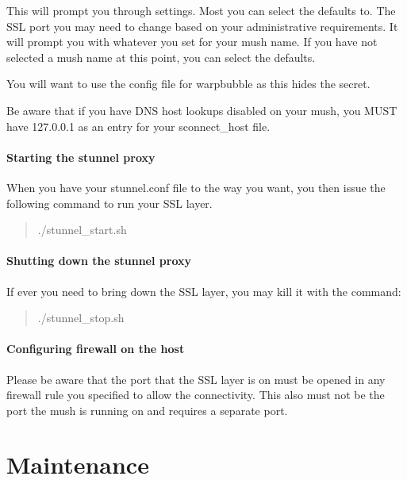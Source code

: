 \documentclass[letterpaper,10pt,english]{sphinxmanual}
\begin{document}
\sphinxAtStartPar
This will prompt you through settings.  Most you can select the defaults to.
The SSL port you may need to change based on your administrative requirements.
It will prompt you with whatever you set for your mush name.  If you have not
selected a mush name at this point, you can select the defaults.

\sphinxAtStartPar
You will want to use the config file for warpbubble as this hides the secret.

\sphinxAtStartPar
Be aware that if you have DNS host lookups disabled on your mush, you
MUST have 127.0.0.1 as an entry for your sconnect\_host file.


\paragraph{Starting the stunnel proxy}
\label{\detokenize{security:starting-the-stunnel-proxy}}
\sphinxAtStartPar
When you have your stunnel.conf file to the way you want, you then
issue the following command to run your SSL layer.
\begin{quote}

\sphinxAtStartPar
./stunnel\_start.sh
\end{quote}


\paragraph{Shutting down the stunnel proxy}
\label{\detokenize{security:shutting-down-the-stunnel-proxy}}
\sphinxAtStartPar
If ever you need to bring down the SSL layer, you may kill it with the command:
\begin{quote}

\sphinxAtStartPar
./stunnel\_stop.sh
\end{quote}


\paragraph{Configuring firewall on the host}
\label{\detokenize{security:configuring-firewall-on-the-host}}
\sphinxAtStartPar
Please be aware that the port that the SSL layer is on must be opened
in any firewall rule you specified to allow the connectivity.  This also must
not be the port the mush is running on and requires a separate port.


\section{Maintenance}
\label{\detokenize{maintenance:maintenance}}\label{\detokenize{maintenance::doc}}
\end{document}
